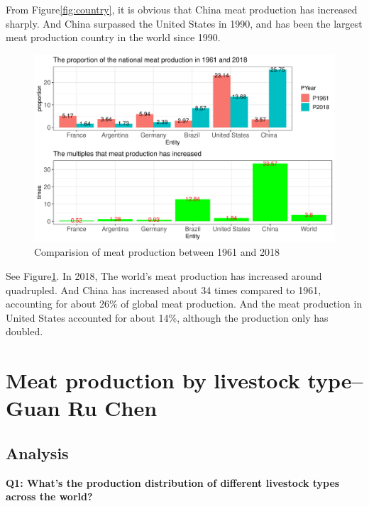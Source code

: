 \documentclass[11pt,a4paper,]{article}
\begin{document}
From Figure\ref{fig:country}, it is obvious that China meat production has increased sharply. And China surpassed the United States in 1990, and has been the largest meat production country in the world since 1990.

\clearpage

\begin{figure}
\centering
\includegraphics{report_files/figure-latex/country-increase-1.pdf}
\caption{\label{fig:country-increase}Comparision of meat production between 1961 and 2018}
\end{figure}

See Figure\ref{fig:country-increase}. In 2018, The world's meat production has increased around quadrupled. And China has increased about 34 times compared to 1961, accounting for about 26\% of global meat production. And the meat production in United States accounted for about 14\%, although the production only has doubled.

\clearpage

\section*{Meat production by livestock type-- Guan Ru Chen}

\subsection*{Analysis}

\textbf{Q1: What's the production distribution of different livestock types across the world?}
\end{document}
